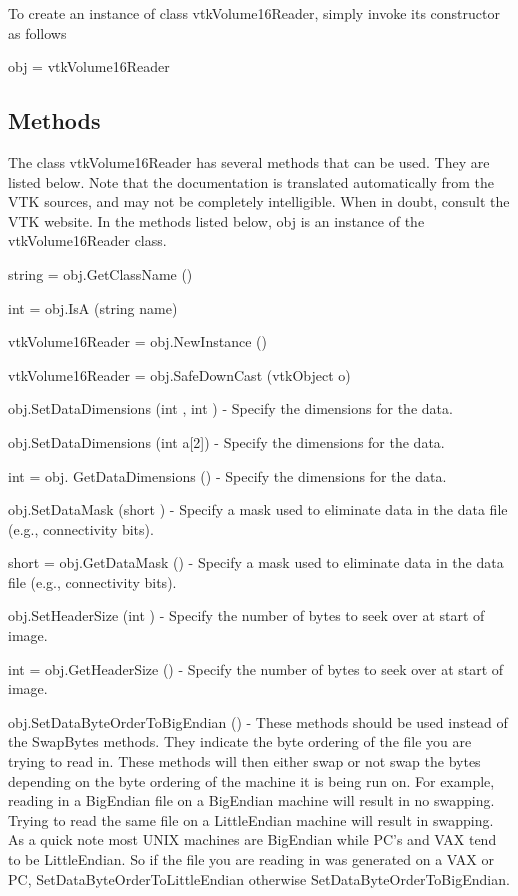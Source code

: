 To create an instance of class vtk\-Volume16\-Reader, simply invoke its constructor as follows \begin{DoxyVerb}  obj = vtkVolume16Reader
\end{DoxyVerb}
 \hypertarget{vtkwidgets_vtkxyplotwidget_Methods}{}\subsection{Methods}\label{vtkwidgets_vtkxyplotwidget_Methods}
The class vtk\-Volume16\-Reader has several methods that can be used. They are listed below. Note that the documentation is translated automatically from the V\-T\-K sources, and may not be completely intelligible. When in doubt, consult the V\-T\-K website. In the methods listed below, {\ttfamily obj} is an instance of the vtk\-Volume16\-Reader class. 
\begin{DoxyItemize}
\item {\ttfamily string = obj.\-Get\-Class\-Name ()}  
\item {\ttfamily int = obj.\-Is\-A (string name)}  
\item {\ttfamily vtk\-Volume16\-Reader = obj.\-New\-Instance ()}  
\item {\ttfamily vtk\-Volume16\-Reader = obj.\-Safe\-Down\-Cast (vtk\-Object o)}  
\item {\ttfamily obj.\-Set\-Data\-Dimensions (int , int )} -\/ Specify the dimensions for the data.  
\item {\ttfamily obj.\-Set\-Data\-Dimensions (int a\mbox{[}2\mbox{]})} -\/ Specify the dimensions for the data.  
\item {\ttfamily int = obj. Get\-Data\-Dimensions ()} -\/ Specify the dimensions for the data.  
\item {\ttfamily obj.\-Set\-Data\-Mask (short )} -\/ Specify a mask used to eliminate data in the data file (e.\-g., connectivity bits).  
\item {\ttfamily short = obj.\-Get\-Data\-Mask ()} -\/ Specify a mask used to eliminate data in the data file (e.\-g., connectivity bits).  
\item {\ttfamily obj.\-Set\-Header\-Size (int )} -\/ Specify the number of bytes to seek over at start of image.  
\item {\ttfamily int = obj.\-Get\-Header\-Size ()} -\/ Specify the number of bytes to seek over at start of image.  
\item {\ttfamily obj.\-Set\-Data\-Byte\-Order\-To\-Big\-Endian ()} -\/ These methods should be used instead of the Swap\-Bytes methods. They indicate the byte ordering of the file you are trying to read in. These methods will then either swap or not swap the bytes depending on the byte ordering of the machine it is being run on. For example, reading in a Big\-Endian file on a Big\-Endian machine will result in no swapping. Trying to read the same file on a Little\-Endian machine will result in swapping. As a quick note most U\-N\-I\-X machines are Big\-Endian while P\-C's and V\-A\-X tend to be Little\-Endian. So if the file you are reading in was generated on a V\-A\-X or P\-C, Set\-Data\-Byte\-Order\-To\-Little\-Endian otherwise Set\-Data\-Byte\-Order\-To\-Big\-Endian.  

\end{DoxyItemize}
